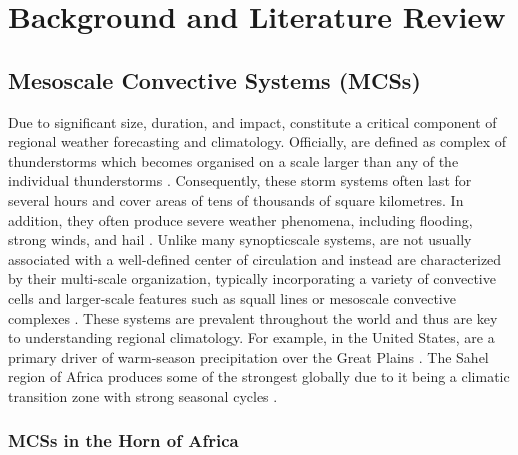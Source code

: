 \chapter{Background and Literature Review}
\label{ch:background}


\section{Mesoscale Convective Systems (MCSs)}

Due to significant size, duration, and impact,  constitute a critical component of regional weather forecasting and climatology. Officially,  are defined as complex of thunderstorms which becomes organised on a scale larger than any of the individual thunderstorms \citep{NOAANWS2025}. Consequently, these storm systems often last for several hours and cover areas of tens of thousands of square kilometres. In addition, they often produce severe weather phenomena, including flooding, strong winds, and hail \citep{Houze2014}. Unlike many \Gls{synopticscale} systems,  are not usually associated with a well-defined center of circulation and instead are characterized by their multi-scale organization, typically incorporating a variety of convective cells and larger-scale features such as squall lines or mesoscale convective complexes \citep{NOAANWS2025,AMS2024}. These systems are prevalent throughout the world and thus are key to understanding regional climatology. For example, in the United States,  are a primary driver of warm-season precipitation over the Great Plains \citep{Haberlie2019}. The Sahel region of Africa produces some of the strongest  globally due to it being a climatic transition zone with strong seasonal cycles \citep{Zipser2006}.

\subsection{MCSs in the Horn of Africa}

